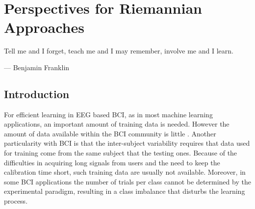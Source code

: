 
\chapter{Perspectives for Riemannian Approaches}
\label{chap:perspectives-riem} 
\epigraph{Tell me and I forget, teach me and I may remember, involve me and I learn.}{--- \textup{Benjamin Franklin}}

\section{Introduction}%
\label{sec:perspective-intro}

For efficient learning in EEG based BCI, as in most machine learning applications, an important amount of training data is needed. 
However the amount of data available within the BCI community is little \citep{delorme_eeg_2015}. 
Another particularity with BCI is that the inter-subject variability requires that data used for training come from the same subject that the testing ones. 
Because of the difficulties in acquiring long signals from users and the need to keep the calibration time short, such training data are usually not available.
Moreover, in some BCI applications the number of trials per class cannot be determined by the experimental paradigm, resulting in a class imbalance that disturbs the learning process.   

